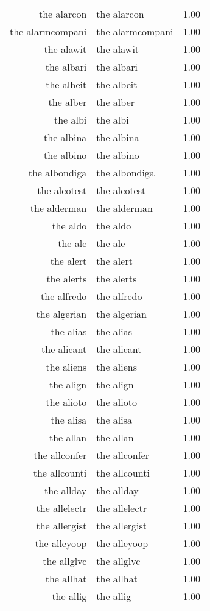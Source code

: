 \begin{table}[ht]
\begin{tabular}{rlr}
  the alarcon & the alarcon & 1.00 \\ 
  the alarmcompani & the alarmcompani & 1.00 \\ 
  the alawit & the alawit & 1.00 \\ 
  the albari & the albari & 1.00 \\ 
  the albeit & the albeit & 1.00 \\ 
  the alber & the alber & 1.00 \\ 
  the albi & the albi & 1.00 \\ 
  the albina & the albina & 1.00 \\ 
  the albino & the albino & 1.00 \\ 
  the albondiga & the albondiga & 1.00 \\ 
  the alcotest & the alcotest & 1.00 \\ 
  the alderman & the alderman & 1.00 \\ 
  the aldo & the aldo & 1.00 \\ 
  the ale & the ale & 1.00 \\ 
  the alert & the alert & 1.00 \\ 
  the alerts & the alerts & 1.00 \\ 
  the alfredo & the alfredo & 1.00 \\ 
  the algerian & the algerian & 1.00 \\ 
  the alias & the alias & 1.00 \\ 
  the alicant & the alicant & 1.00 \\ 
  the aliens & the aliens & 1.00 \\ 
  the align & the align & 1.00 \\ 
  the alioto & the alioto & 1.00 \\ 
  the alisa & the alisa & 1.00 \\ 
  the allan & the allan & 1.00 \\ 
  the allconfer & the allconfer & 1.00 \\ 
  the allcounti & the allcounti & 1.00 \\ 
  the allday & the allday & 1.00 \\ 
  the allelectr & the allelectr & 1.00 \\ 
  the allergist & the allergist & 1.00 \\ 
  the alleyoop & the alleyoop & 1.00 \\ 
  the allglvc & the allglvc & 1.00 \\ 
  the allhat & the allhat & 1.00 \\ 
  the allig & the allig & 1.00 \\ 

\end{tabular}
\end{table}
